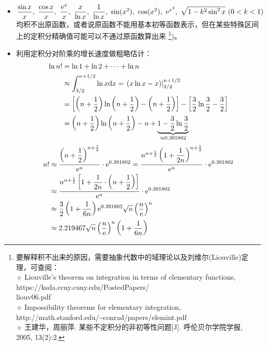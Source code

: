 \begin{itemize}[leftmargin=\inteval{\myitemleftmargin}pt,itemsep=
   \inteval{\myitemitempsep}pt,topsep=\inteval{\myitemtopsep}pt]
\item $ \dfrac{\sin x}{x},\ \dfrac{\cos x}{x},\ \dfrac{\e^x}{x},\ 
\dfrac{x}{\ln x},\ \dfrac{1}{\ln x},\ \sin(x^2),\ \cos(x^2),\ 
\e^{x^2},\ \sqrt{1-k^2\sin^2 x}\ (0<k<1) $均积不出原函数，或者说原函数不能用基本初等函数表示，但在某些特殊区间上的定积分精确值可能可以不通过原函数算出来
\footnote{要解释积不出来的原因，需要抽象代数中的域理论以及刘维尔(Liouville)定理，可查阅：\\
$ \diamond $ Liouville's theorem on integration in terms of elementary functions,\quad 
https://ksda.ccny.cuny.edu/PostedPapers/\\liouv06.pdf \\
$ \diamond $ Impossibility theorems for elementary integration,
\quad http://math.stanford.edu/\textasciitilde conrad/papers/elemint.pdf \\
$ \diamond $ 王建华，周丽萍. 某些不定积分的非初等性问题[J]. 
呼伦贝尔学院学报, 2005, 13(2):2.})。

\item 利用定积分对阶乘的增长速度做粗略估计：
\begin{align*}
    \ln n! &=\ln 1+\ln 2+ \cdots +\ln n  \\
    &\approx \int_{3/2}^{n+1/2} \ln x\mathrm{d} x  
    =\left.(x\ln x - x)\right|_{3/2}^{n+1/2} \\
    &= \left[\left(n+\dfrac{1}{2}\right)
    \ln \left(n+\dfrac{1}{2}\right)-\left(n+\dfrac{1}{2}\right)\right]
    -\left[\dfrac{3}{2}\ln \dfrac{3}{2}-\dfrac{3}{2} \right] \\
    &=\left(n+\dfrac{1}{2}\right) \ln \left(n+\dfrac{1}{2}\right)
    -n+\underbrace{1-\dfrac{3}{2}\ln \dfrac{3}{2}}_{\approx 0.391802 }
\end{align*} 
\begin{align}
    n! &\approx \dfrac{\left(n+\dfrac{1}{2}\right)^
        {n+\frac{1}{2}}}{\mathrm{e}^n} \cdot \mathrm{e}^{0.391802}
    = \dfrac{n^{{n+\frac{1}{2}}} \left(1+\dfrac{1}{2n}\right)^
        {n+\frac{1}{2}}}{\mathrm{e}^n} \cdot \mathrm{e}^{0.391802} \nonumber\\ 
    &\approx \dfrac{n^{{n+\frac{1}{2}}} \left[1+\dfrac{1}{2n}
        \cdot\left(n+\dfrac{1}{2}\right)\right]}{\mathrm{e}^n}\cdot \mathrm{e}^{0.391802}
    \nonumber \\
    &\approx \dfrac{3}{2}\left(1+\dfrac{1}{6n}\right)\mathrm{e}^{0.391802}\sqrt{n}
    \left(\dfrac{n}{\mathrm{e}}\right)^n \\
    & \approx 2.219467\sqrt{n}\left(\dfrac{n}{\mathrm{e}}\right)^n
    \left(1+\dfrac{1}{6n}\right) \label{积分估计阶乘-系数2.219}
\end{align}


\end{itemize}
